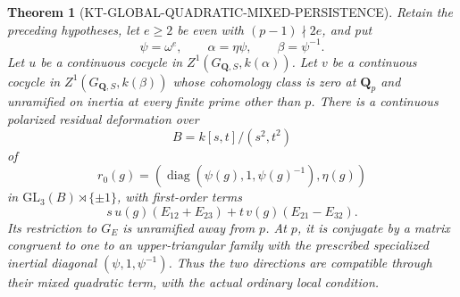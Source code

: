 \documentclass[11pt,a4paper]{article}
\newtheorem{theorem}{Theorem}[section]
\theoremstyle{definition}
\begin{document}
\begin{theorem}[KT-GLOBAL-QUADRATIC-MIXED-PERSISTENCE]
Retain the preceding hypotheses, let $e\ge2$ be even with
$(p-1)\nmid2e$, and put
\[
        \psi=\omega^e,\qquad
        \alpha=\eta\psi,\qquad \beta=\psi^{-1}.
                                                               \tag{MC.7}
\]
Let $u$ be a continuous cocycle in
$Z^1(G_{\mathbf Q,S},k(\alpha))$.
Let $v$ be a continuous cocycle in $Z^1(G_{\mathbf Q,S},k(\beta))$
whose cohomology class is zero at $\mathbf Q_p$ and unramified
on inertia at every finite prime other than $p$.
There is a continuous polarized residual deformation over
\[
                           B=k[s,t]/(s^2,t^2)             \tag{MC.8}
\]
of
\[
 r_0(g)=(\operatorname{diag}(\psi(g),1,\psi(g)^{-1}),\eta(g))
\]
in $\mathrm{GL}_3(B)\rtimes\{\pm1\}$, with first-order
terms
\[
       s\,u(g)(E_{12}+E_{23})+
                         t\,v(g)(E_{21}-E_{32}).          \tag{MC.9}
\]
Its restriction to $G_E$ is unramified away from $p$.
At $p$, it is conjugate by a matrix congruent to one to an
upper-triangular family with the prescribed specialized
inertial diagonal $(\psi,1,\psi^{-1})$.
Thus the two directions are compatible through their mixed
quadratic term, with the actual ordinary local condition.
\end{theorem}
\end{document}
